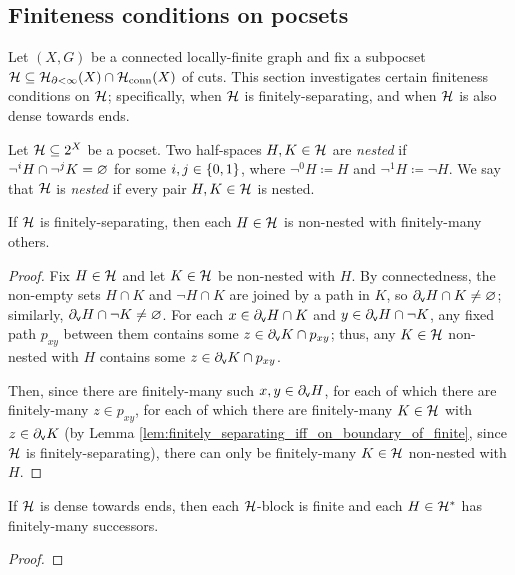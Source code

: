 \documentclass[reqno]{amsart}
\begin{document}
    \subsection{Finiteness conditions on pocsets}\label{sec:finiteness_conditions_on_pocsets_dense_cuts}

    Let $(X,G)$ be a connected locally-finite graph and fix a subpocset $\mc{H}\subseteq\mc{H}_{\del<\infty}(X)\cap\mc{H}_\mathrm{conn}(X)$ of cuts. This section investigates certain finiteness conditions on $\mc{H}$; specifically, when $\mc{H}$ is finitely-separating, and when $\mc{H}$ is also dense towards ends.

    \begin{definition}\label{def:nested}
        Let $\mc{H}\subseteq2^X$ be a pocset. Two half-spaces $H,K\in\mc{H}$ are \textit{nested} if $\lnot^iH\cap\lnot^jK=\em$ for some $i,j\in\l\{0,1\r\}$, where $\lnot^0H\coloneqq H$ and $\lnot^1H\coloneqq\lnot H$. We say that $\mc{H}$ is \textit{nested} if every pair $H,K\in\mc{H}$ is nested.
    \end{definition}

    \begin{lemma}\label{lem:connected_cuts_non_nested_finitely_others}
        If $\mc{H}$ is finitely-separating, then each $H\in\mc{H}$ is non-nested with finitely-many others.
    \end{lemma}
    \begin{proof}
        Fix $H\in\mc{H}$ and let $K\in\mc{H}$ be non-nested with $H$. By connectedness, the non-empty sets $H\cap K$ and $\lnot H\cap K$ are joined by a path in $K$, so $\del_\mathsf{v}H\cap K\neq\em$; similarly, $\del_\mathsf{v}H\cap\lnot K\neq\em$. For each $x\in\del_\mathsf{v}H\cap K$ and $y\in\del_\mathsf{v}H\cap\lnot K$, any fixed path $p_{xy}$ between them contains some $z\in\del_\mathsf{v}K\cap p_{xy}$; thus, any $K\in\mc{H}$ non-nested with $H$ contains some $z\in\del_\mathsf{v}K\cap p_{xy}$.

        Then, since there are finitely-many such $x,y\in\del_\mathsf{v}H$, for each of which there are finitely-many $z\in p_{xy}$, for each of which there are finitely-many $K\in\mc{H}$ with $z\in\del_\mathsf{v}K$ (by Lemma \ref{lem:finitely_separating_iff_on_boundary_of_finite}, since $\mc{H}$ is finitely-separating), there can only be finitely-many $K\in\mc{H}$ non-nested with $H$.
    \end{proof}

    \begin{proposition}\label{prp:dense_cuts_induces_proper_walling}
        If $\mc{H}$ is dense towards ends, then each $\mc{H}$-block is finite and each $H\in\mc{H}^\ast$ has finitely-many successors.
    \end{proposition}
    \begin{proof}
    \end{proof}
\end{document}
